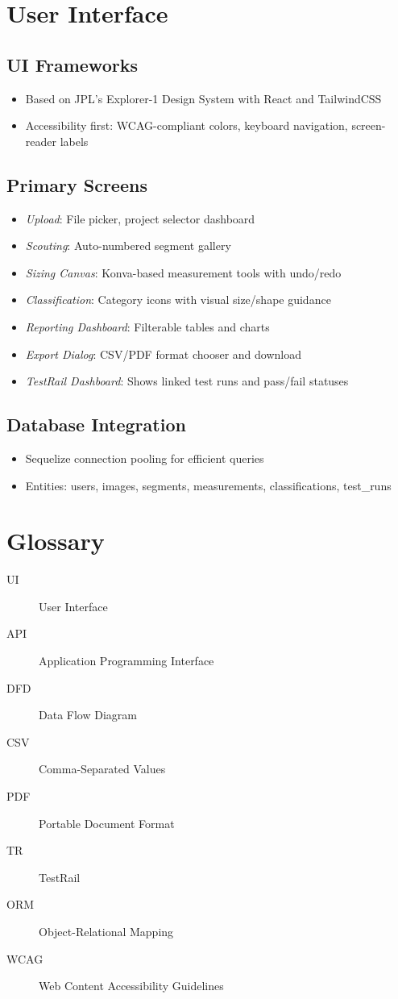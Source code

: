 \documentclass{article}
\begin{document}
\section{User Interface}
\subsection{UI Frameworks}
\begin{itemize}
  \item Based on JPL’s Explorer-1 Design System with React and TailwindCSS
  \item Accessibility first: WCAG-compliant colors, keyboard navigation, screen-reader labels
\end{itemize}

\subsection{Primary Screens}
\begin{itemize}
  \item \emph{Upload}: File picker, project selector dashboard
  \item \emph{Scouting}: Auto-numbered segment gallery
  \item \emph{Sizing Canvas}: Konva-based measurement tools with undo/redo
  \item \emph{Classification}: Category icons with visual size/shape guidance
  \item \emph{Reporting Dashboard}: Filterable tables and charts
  \item \emph{Export Dialog}: CSV/PDF format chooser and download
  \item \emph{TestRail Dashboard}: Shows linked test runs and pass/fail statuses
\end{itemize}

\subsection{Database Integration}
\begin{itemize}
  \item Sequelize connection pooling for efficient queries
  \item Entities: users, images, segments, measurements, classifications, test_runs
\end{itemize}

\section{Glossary}
\begin{description}
  \item[UI] User Interface
  \item[API] Application Programming Interface
  \item[DFD] Data Flow Diagram
  \item[CSV] Comma-Separated Values
  \item[PDF] Portable Document Format
  \item[TR] TestRail
  \item[ORM] Object-Relational Mapping
  \item[WCAG] Web Content Accessibility Guidelines
\end{description}
\end{document}
